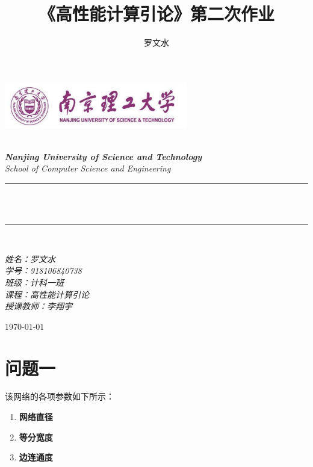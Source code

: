 \documentclass[12pt]{article}
\title{《高性能计算引论》第二次作业}
\author{\textup{罗文水}}
\begin{document}
	
	\begin{titlepage}
		\newcommand{\HRule}{\rule{\linewidth}{0.5mm}}
		\begin{center}
			\includegraphics[width=8cm]{../HPC_P1/title}			
		\end{center}
		
		\center 
		\quad\\[1.5cm]
		\textsl{\Large \textbf{Nanjing University of Science and Technology} }\\[0.5cm] 
		\textsl{\large School of Computer Science and Engineering}\\[0.5cm] 
		\makeatletter
		\HRule \\[0.4cm]
		{ \huge \bfseries \@title}\\[0.25cm] 
		\HRule \\[1.5cm]
	\begin{minipage}{0.42\textwidth}
		\begin{flushleft}
			
			\Large{\emph{姓名：罗文水}}
			\\
			\Large{\emph{学号：918106840738}}
			\\
			\Large{\emph{班级：计科一班}}
			\\
			\Large{\emph{课程：高性能计算引论}}
			\\
			\Large{\emph{授课教师：李翔宇}}
			\\
		\end{flushleft}
	\end{minipage}
		\vspace{7em} 
		
		{\large \today}\\[2cm] 
		\vfill 
	\end{titlepage}
	
	\newpage
\section{问题一}
	该网络的各项参数如下所示：
	\begin{enumerate}
		\item \textbf{网络直径}
		\item \textbf{等分宽度}
		\item \textbf{边连通度}
	\end{enumerate}
\newpage
\end{document}

